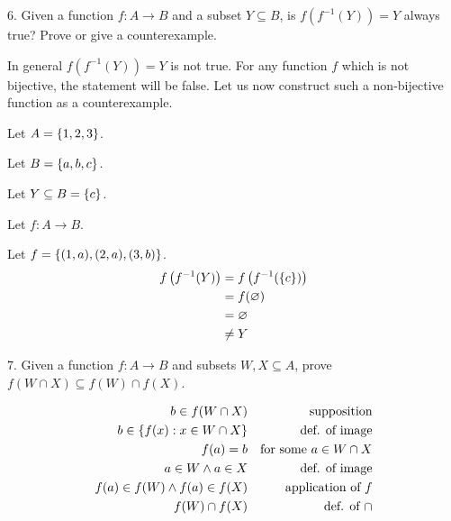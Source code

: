 \documentclass{idrisMemo}
\begin{document}
\begin{prooflist}{6. Given a function $f: A \rightarrow B$ and a subset $Y
    \subseteq B$, is $f\left(f^{-1}(Y)\right)=Y$ always true? Prove or give a
counterexample.}
\item \imagedef{}
\item In general $f\left(f^{-1}(Y)\right)=Y$ is not true. For any function $f$
    which is not bijective, the statement will be false. Let us now construct
    such a non-bijective function as a counterexample.
\item Let $A=\{1, 2, 3\}$.
\item Let $B=\{a, b, c\}$.
\item Let $Y\subseteq B = \{c\}$.
\item Let $f: A \rightarrow B$.
\item Let $f = \{(1, a), (2, a), (3, b)\}$.
\begin{align*}
    f\left(f^{-1}(Y)\right) &= f\left(f^{-1}(\{c\})\right)\\
    &= f(\varnothing)\\
    &= \varnothing\\
    &\neq Y
\end{align*}
\end{prooflist}

\begin{prooflist}{7. Given a function $f: A \rightarrow B$ and subsets $W, X \subseteq A$, prove $f(W \cap X) \subseteq f(W) \cap f(X)$.}
\item \imagedef{}
\begin{align*}
    b\in f(W\cap X) && \text{supposition}\\
    b\in \{f(x): x \in W\cap X\} && \text{def. of image}\\
    f(a) = b && \text{for some }a\in W\cap X\\
    a \in W \land a \in X&&\text{def. of image}\\
    f(a) \in f(W) \land f(a) \in f(X)&&\text{application of }f\\
    f(W) \cap f(X)&&\text{def. of }\cap
\end{align*}
\end{prooflist}
\end{document}
